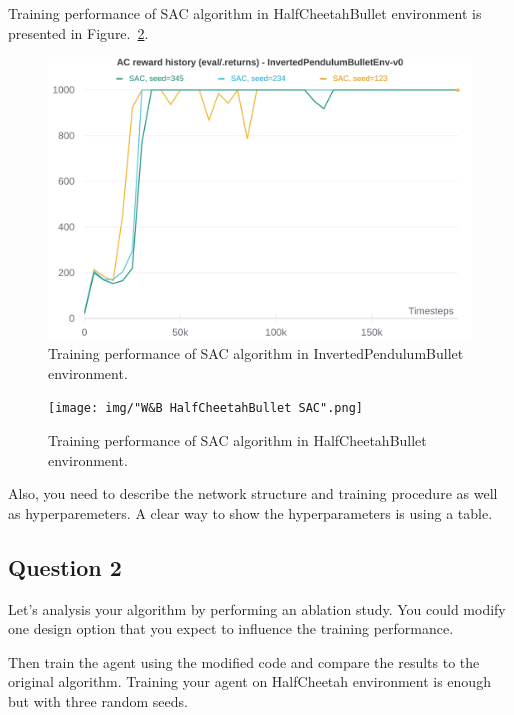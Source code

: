 \documentclass[12pt]{article}
\begin{document}
Training performance of SAC algorithm in HalfCheetahBullet environment is presented in Figure.~\ref*{fig:fig6}.
\newline


\pagebreak

\begin{figure}[pht] 
	\centering  %
    \includegraphics[width=0.65\columnwidth]{img/WB_InvertedPendulumBullet_SAC.png}
	\caption{Training performance of SAC algorithm in InvertedPendulumBullet environment.}
	\label{fig:fig5}
\end{figure}

\begin{figure}[phb] 
	\centering  %
    \texttt{[image: img/"W\&B HalfCheetahBullet SAC".png]}
	\caption{Training performance of SAC algorithm in HalfCheetahBullet environment.}
	\label{fig:fig6}
\end{figure}

\pagebreak

\noindent
Also, you need to describe the network structure and training procedure as well
as hyperparemeters. A clear way to show the hyperparameters is using a table.

\subsection*{Question 2}

\noindent
Let’s analysis your algorithm by performing an ablation study. You could modify one design
option that you expect to influence the training performance. 
\newline

\noindent
Then train the agent using the modified code and compare the results to the original algorithm. Training your agent on HalfCheetah environment is enough but with three random seeds.
\newline
\end{document}
